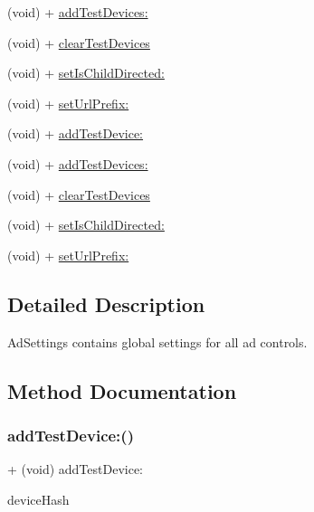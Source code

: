 \begin{DoxyCompactItemize}
\item 
(void) + \hyperlink{interfaceFBAdSettings_aef0e9decab562f63ecadc72dbb594a56}{add\+Test\+Devices\+:}
\item 
(void) + \hyperlink{interfaceFBAdSettings_af6d62d5a096e6701bb83407114eb7dd6}{clear\+Test\+Devices}
\item 
(void) + \hyperlink{interfaceFBAdSettings_a0f1e7129f1c07b5420d9a6a1f7eb9768}{set\+Is\+Child\+Directed\+:}
\item 
(void) + \hyperlink{interfaceFBAdSettings_aab1304a0308648520b5dc1fda60a944c}{set\+Url\+Prefix\+:}
\item 
(void) + \hyperlink{interfaceFBAdSettings_adf2fc44110adb3613551750bf42671af}{add\+Test\+Device\+:}
\item 
(void) + \hyperlink{interfaceFBAdSettings_aef0e9decab562f63ecadc72dbb594a56}{add\+Test\+Devices\+:}
\item 
(void) + \hyperlink{interfaceFBAdSettings_af6d62d5a096e6701bb83407114eb7dd6}{clear\+Test\+Devices}
\item 
(void) + \hyperlink{interfaceFBAdSettings_a0f1e7129f1c07b5420d9a6a1f7eb9768}{set\+Is\+Child\+Directed\+:}
\item 
(void) + \hyperlink{interfaceFBAdSettings_aab1304a0308648520b5dc1fda60a944c}{set\+Url\+Prefix\+:}
\end{DoxyCompactItemize}


\subsection{Detailed Description}
Ad\+Settings contains global settings for all ad controls. 

\subsection{Method Documentation}
\mbox{\label{interfaceFBAdSettings_adf2fc44110adb3613551750bf42671af}} 
\subsubsection{\texorpdfstring{add\+Test\+Device\+:()}{addTestDevice:()}\hspace{0.1cm}{\footnotesize\ttfamily [1/5]}}
{\footnotesize\ttfamily + (void) add\+Test\+Device\+: \begin{DoxyParamCaption}\item[{(N\+S\+String $\ast$)}]{device\+Hash }\end{DoxyParamCaption}}

